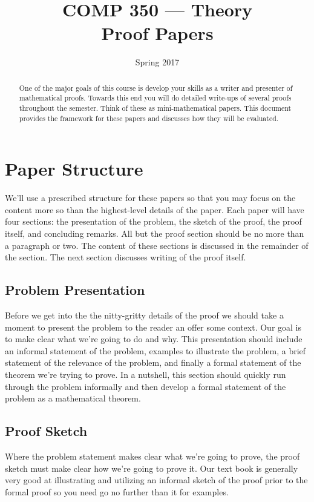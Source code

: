 \documentclass{tufte-handout}
\title{COMP 350 --- Theory \\  Proof Papers}
\author{  }
\date{Spring 2017}
\begin{document}
\maketitle

\begin{abstract}
One of the major goals of this course is develop your skills as a writer and presenter of mathematical proofs. Towards this end you will do detailed write-ups of several proofs throughout the semester. Think of these as mini-mathematical papers. This document provides the framework for these papers and discusses how they will be evaluated.
\end{abstract}

\section{Paper Structure}

We'll use a prescribed structure for these papers so that you may focus on the content more so than the highest-level details of the paper. Each paper will have four sections: the presentation of the problem, the sketch of the proof, the proof itself, and concluding remarks. All but the proof section should be no more than a paragraph or two. The content of these sections is discussed in the remainder of the section. The next section discusses writing of the proof itself.

\subsection{ Problem Presentation }

Before we get into the the nitty-gritty details of the proof we should take a moment to present the problem to the reader an offer some context. Our goal is to make clear what we're going to do and why. This presentation should include an informal statement of the problem, examples to illustrate the problem, a brief statement of the relevance of the problem, and finally a formal statement of the theorem we're trying to prove.  In a nutshell, this section should quickly run through the problem informally and then develop a formal statement of the problem as a mathematical theorem.

\subsection{ Proof Sketch }

Where the problem statement makes clear what we're going to prove, the proof sketch must make clear how we're going to prove it. Our text book is generally very good at illustrating and utilizing an informal sketch of the proof prior to the formal proof so you need go no further than it for examples.
\end{document}
